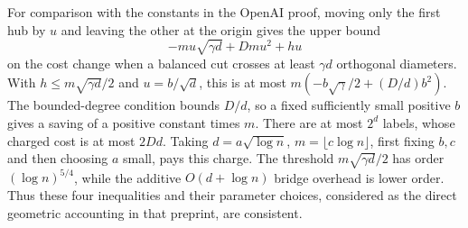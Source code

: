 For comparison with the constants in the OpenAI proof, moving only the first hub by $u$ and leaving the other at the origin gives the upper bound
\[
 -mu\sqrt{\gamma d}+Dmu^2+hu
\]
on the cost change when a balanced cut crosses at least $\gamma d$ orthogonal diameters. With $h\leq m\sqrt{\gamma d}/2$ and $u=b/\sqrt d$, this is at most $m(-b\sqrt\gamma/2+(D/d)b^2)$. The bounded-degree condition bounds $D/d$, so a fixed sufficiently small positive $b$ gives a saving of a positive constant times $m$. There are at most $2^d$ labels, whose charged cost is at most $2Dd$. Taking $d=a\sqrt{\log n}$, $m=\lfloor c\log n\rfloor$, first fixing $b,c$ and then choosing $a$ small, pays this charge. The threshold $m\sqrt{\gamma d}/2$ has order $(\log n)^{5/4}$, while the additive $O(d+\log n)$ bridge overhead is lower order. Thus these four inequalities and their parameter choices, considered as the direct geometric accounting in that preprint, are consistent.

